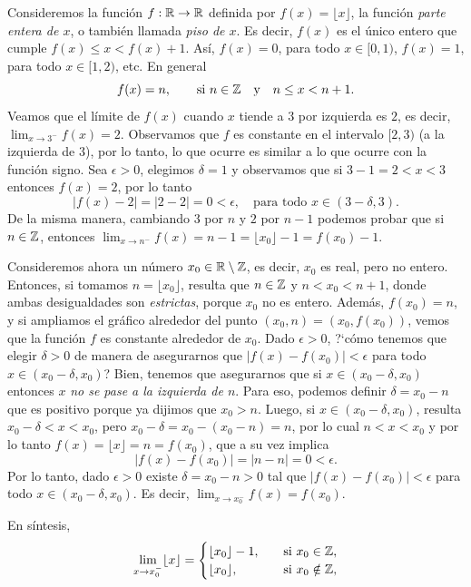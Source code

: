 \begin{example}
Consideremos la función $f:\mathbb{R}\to\mathbb{R}$ definida por $f(x)=\lfloor x\rfloor$, la función \emph{parte entera de $x$}, o también llamada \emph{piso de $x$}.
Es decir, $f(x)$ es el único entero que cumple $f(x)\le x< f(x)+1$. Así, $f(x)=0$, para todo $x\in[0,1)$, $f(x)=1$, para todo $x\in[1,2)$, etc. En general
\[
f(x)=n, \qquad \text{si }n\in\mathbb{Z} \quad\text{y}\quad n\le x < n+1.
\]
Veamos que el límite de $f(x)$ cuando $x$ tiende a $3$ por izquierda es $2$, es decir, $\lim_{x\to 3^-}f(x)=2$.
Observamos que $f$ es constante en el intervalo $[2,3)$ (a la izquierda de $3$), por lo tanto, lo que ocurre es similar a lo que ocurre con la función signo.
Sea $\epsilon>0$, elegimos $\delta=1$ y observamos que si $3-1=2<x<3$ entonces $f(x)=2$,
por lo tanto
\[
|f(x)-2| = |2-2|=0<\epsilon,\quad\text{para todo $x\in (3-\delta,3)$}.
\]
De la misma manera, cambiando $3$ por $n$ y $2$ por $n-1$ podemos probar que si $n\in\mathbb{Z}$, entonces $\lim_{x\to n^-}f(x)=n-1=\lfloor x_0 \rfloor - 1 = f(x_0)-1$.

Consideremos ahora un número $x_0\in \mathbb{R}\setminus\mathbb{Z}$, es decir, $x_0$ es real, pero no entero. Entonces, si tomamos $n=\lfloor x_0 \rfloor$, resulta que
$n\in\mathbb{Z}$ y $n<x_0<n+1$, donde ambas desigualdades son \emph{estrictas}, porque $x_0$ no es entero.
Además, $f(x_0)=n$, y si ampliamos el gráfico alrededor del punto $(x_0,n)=(x_0,f(x_0))$, vemos que la función $f$ es constante alrededor de $x_0$.
Dado $\epsilon>0$, ?`cómo tenemos que elegir $\delta>0$ de manera de asegurarnos que $|f(x)-f(x_0)|<\epsilon$ para todo $x\in(x_0-\delta,x_0)$?
Bien, tenemos que asegurarnos que si $x\in(x_0-\delta,x_0)$ entonces $x$ \emph{no se pase a la izquierda de $n$}.
Para eso, podemos definir $\delta=x_0-n$ que es positivo porque ya dijimos que $x_0>n$. Luego, si
$x\in(x_0-\delta,x_0)$, resulta $x_0-\delta<x<x_0$, pero $x_0-\delta=x_0-(x_0-n)=n$, por lo cual $n<x<x_0$ y por lo tanto $f(x)=\lfloor x \rfloor = n = f(x_0)$, que a su vez implica
\[
|f(x)-f(x_0)|=|n-n|=0<\epsilon.
\]
Por lo tanto, dado $\epsilon>0$ existe $\delta=x_0-n>0$ tal que $|f(x)-f(x_0)|<\epsilon$ para todo $x\in(x_0-\delta,x_0)$. Es decir, $\lim_{x\to x_0^-}f(x)=f(x_0)$.

En síntesis,
\[
\lim_{x\to x_0^-} \lfloor x \rfloor
= \begin{cases}
    \lfloor x_0 \rfloor - 1,
    \quad&\text{si } x_0 \in\mathbb{Z},
    \\
    \lfloor x_0 \rfloor ,
    \quad&\text{si } x_0 \notin\mathbb{Z},
\end{cases}
\]
\end{example}

